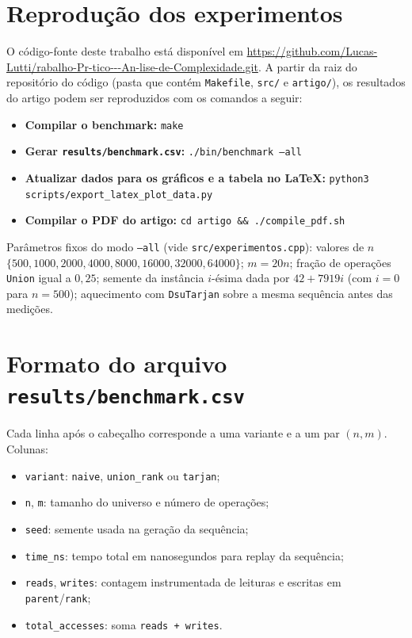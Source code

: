 \section{Reprodução dos experimentos}
\label{apendice:reproducao}

O código-fonte deste trabalho está disponível em \url{https://github.com/Lucas-Lutti/rabalho-Pr-tico---An-lise-de-Complexidade.git}. A partir da raiz do repositório do código (pasta que contém \texttt{Makefile}, \texttt{src/} e \texttt{artigo/}), os resultados do artigo podem ser reproduzidos com os comandos a seguir:

\begin{itemize}
  \item \textbf{Compilar o benchmark:} \texttt{make}
  \item \textbf{Gerar \texttt{results/benchmark.csv}:} \texttt{./bin/benchmark --all}
  \item \textbf{Atualizar dados para os gráficos e a tabela no \LaTeX{}:} \texttt{python3 scripts/export\_latex\_plot\_data.py}
  \item \textbf{Compilar o PDF do artigo:} \texttt{cd artigo \&\& ./compile\_pdf.sh}
\end{itemize}

\noindent Parâmetros fixos do modo \texttt{--all} (vide \texttt{src/experimentos.cpp}): valores de $n$ $\{500,1000,2000,4000,8000,16000,32000,64000\}$; $m=20n$; fração de operações \texttt{Union} igual a $0{,}25$; semente da instância $i$-ésima dada por $42+7919i$ (com $i=0$ para $n=500$); aquecimento com \texttt{DsuTarjan} sobre a mesma sequência antes das medições.

\section{Formato do arquivo \texttt{results/benchmark.csv}}
\label{apendice:csv}

Cada linha após o cabeçalho corresponde a uma variante e a um par $(n,m)$. Colunas:

\begin{itemize}
  \item \texttt{variant}: \texttt{naive}, \texttt{union\_rank} ou \texttt{tarjan};
  \item \texttt{n}, \texttt{m}: tamanho do universo e número de operações;
  \item \texttt{seed}: semente usada na geração da sequência;
  \item \texttt{time\_ns}: tempo total em nanosegundos para replay da sequência;
  \item \texttt{reads}, \texttt{writes}: contagem instrumentada de leituras e escritas em \texttt{parent}/\texttt{rank};
  \item \texttt{total\_accesses}: soma \texttt{reads + writes}.
\end{itemize}

